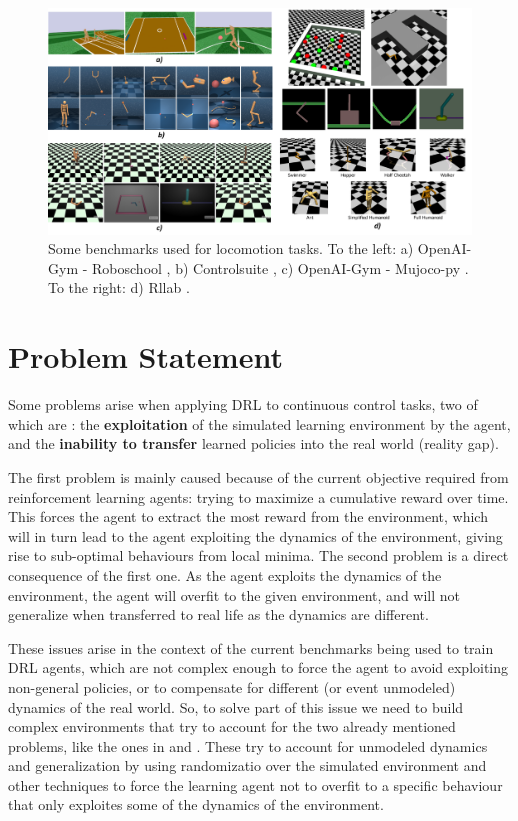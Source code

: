 \begin{figure}[!ht]
	\centering
	\includegraphics[width=6.0in]{./chapters/imgs/img_sample_benchmarks.png}
	\caption[Sample benchmarks for continuous control]{Some benchmarks used for locomotion tasks. 
		To the left: a) OpenAI-Gym - Roboschool \citep{roboschool},
					 b) Controlsuite  \citep{Controlsuite},
					 c) OpenAI-Gym - Mujoco-py \citep{OpenAIgym}.
		To the right: d) Rllab \citep{rllab}. }
	\label{fig:sample-benchmarks}
\end{figure}

\section{Problem Statement}
\label{sec:problem}

Some problems arise when applying DRL to continuous control tasks, two of which are : the \textbf{exploitation} 
of the simulated learning environment by the agent, and the \textbf{inability to transfer} learned policies into 
the real world (reality gap).

The first problem is mainly caused because of the current objective required from reinforcement learning agents: trying to maximize
a cumulative reward over time. This forces the agent to extract the most reward from the environment, which will in
turn lead to the agent exploiting the dynamics of the environment, giving rise to sub-optimal behaviours from local minima.
The second problem is a direct consequence of the first one. As the agent exploits the dynamics of the environment, the agent will overfit
to the given environment, and will not generalize when transferred to real life as the dynamics are different.

These issues arise in the context of the current benchmarks being used to train DRL agents, which are not complex enough to
force the agent to avoid exploiting non-general policies, or to compensate for different (or event unmodeled) dynamics of the real world.
So, to solve part of this issue we need to build complex environments that try to account for the two already mentioned problems, like the ones
in \citeauthor{simtoreal-quadruped} and \citeauthor{dexterity-openai}. These try to account for unmodeled dynamics and generalization by
using randomizatio over the simulated environment and other techniques to force the learning agent not to overfit to a specific behaviour that
only exploites some of the dynamics of the environment.


